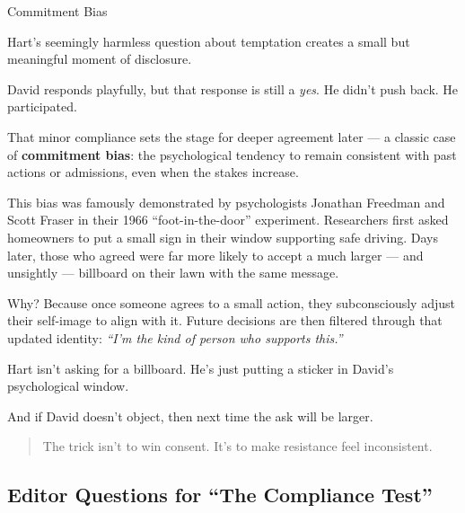 \begin{PsychologicalSidebar}{Commitment Bias}

    Hart's seemingly harmless question about temptation creates a small but meaningful moment of disclosure.

    \medskip
    
    David responds playfully, but that response is still a \textit{yes}.  
    He didn’t push back. He participated.

    \medskip
    
    
    That minor compliance sets the stage for deeper agreement later — a classic case of \textbf{commitment bias}: 
    the psychological tendency to remain consistent with past actions or admissions, even when the stakes increase.
    
    \medskip
    
    This bias was famously demonstrated by psychologists Jonathan Freedman and Scott Fraser in their 1966 “foot-in-the-door” 
    experiment. Researchers first asked homeowners to put a small sign in their window supporting safe driving. Days later, 
    those who agreed were far more likely to accept a much larger — and unsightly — billboard on their lawn with the same message.

    \medskip
    
    
    Why? Because once someone agrees to a small action, they subconsciously adjust their self-image to align with it.  
    Future decisions are then filtered through that updated identity: \textit{“I’m the kind of person who supports this.”}
    
    \medskip
    
    Hart isn’t asking for a billboard. He’s just putting a sticker in David’s psychological window.

    \medskip
    
    
    And if David doesn’t object, then next time the ask will be larger.
    
    \begin{quote}
    The trick isn’t to win consent.  
    It’s to make resistance feel inconsistent.
    \end{quote}
    
\end{PsychologicalSidebar}
    

\subsection*{Editor Questions for ``The Compliance Test''}


